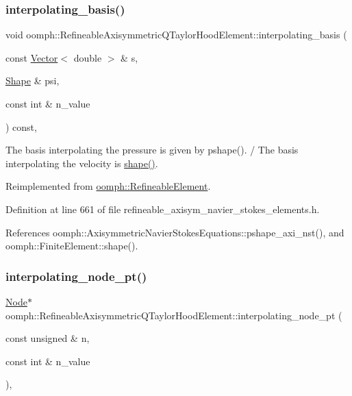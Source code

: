 \subsubsection{\texorpdfstring{interpolating\+\_\+basis()}{interpolating\_basis()}}
{\footnotesize\ttfamily void oomph\+::\+Refineable\+Axisymmetric\+Q\+Taylor\+Hood\+Element\+::interpolating\+\_\+basis (\begin{DoxyParamCaption}\item[{const \hyperlink{classoomph_1_1Vector}{Vector}$<$ double $>$ \&}]{s,  }\item[{\hyperlink{classoomph_1_1Shape}{Shape} \&}]{psi,  }\item[{const int \&}]{n\+\_\+value }\end{DoxyParamCaption}) const\hspace{0.3cm}{\ttfamily [inline]}, {\ttfamily [virtual]}}



The basis interpolating the pressure is given by pshape(). / The basis interpolating the velocity is \hyperlink{classoomph_1_1FiniteElement_a58a25b6859ddd43b7bfe64a19fee5023}{shape()}. 



Reimplemented from \hyperlink{classoomph_1_1RefineableElement_a8ca420443c28708e5c6315a80f520137}{oomph\+::\+Refineable\+Element}.



Definition at line 661 of file refineable\+\_\+axisym\+\_\+navier\+\_\+stokes\+\_\+elements.\+h.



References oomph\+::\+Axisymmetric\+Navier\+Stokes\+Equations\+::pshape\+\_\+axi\+\_\+nst(), and oomph\+::\+Finite\+Element\+::shape().

\mbox{\label{classoomph_1_1RefineableAxisymmetricQTaylorHoodElement_a8545337ffdd94e8311b379f8762bb6af}} 
\subsubsection{\texorpdfstring{interpolating\+\_\+node\+\_\+pt()}{interpolating\_node\_pt()}}
{\footnotesize\ttfamily \hyperlink{classoomph_1_1Node}{Node}$\ast$ oomph\+::\+Refineable\+Axisymmetric\+Q\+Taylor\+Hood\+Element\+::interpolating\+\_\+node\+\_\+pt (\begin{DoxyParamCaption}\item[{const unsigned \&}]{n,  }\item[{const int \&}]{n\+\_\+value }\end{DoxyParamCaption})\hspace{0.3cm}{\ttfamily [inline]}, {\ttfamily [virtual]}}



